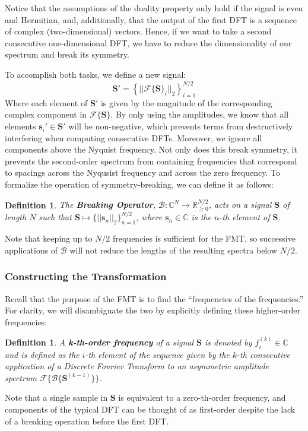 \documentclass[11pt,twoside]{report}
\newtheorem{definition}[thm]{Definition}
\numberwithin{thm}{section}
\numberwithin{equation}{section}
\begin{document}
Notice that the assumptions of the duality property only hold if the signal is even and Hermitian, and, additionally, that the output of the first DFT is a sequence of complex (two-dimensional) vectors. Hence, if we want to take a second consecutive one-dimensional DFT, we have to reduce the dimensionality of our spectrum and break its symmetry. 

To accomplish both tasks, we define a new signal:
\begin{equation}
 \mathbf{S}' = \displaystyle\left\{||\mathcal{F}\{\mathbf{S}\}_i||_2\right\}_{i=1}^{N/2}   
\end{equation}
Where each element of $\mathbf{S}'$ is given by the magnitude of the corresponding complex component in $\mathcal{F}\{\mathbf{S}\}$. By only using the amplitudes, we know that all elements $\mathbf{s}_i' \in \mathbf{S}'$ will be non-negative, which prevents terms from destructively interfering when computing consecutive DFTs. Moreover, we ignore all components above the Nyquist frequency. Not only does this break symmetry, it prevents the second-order spectrum from containing frequencies that correspond to spacings across the Nyqusist frequency and across the zero frequency. To formalize the operation of symmetry-breaking, we can define it as follows:
\begin{definition}
    The \textbf{Breaking Operator}, $\mathcal{B}: \mathbb{C}^N \to \mathbb{R}_{\geq0}^{N/2}$, acts on a signal $\mathbf{S}$ of length $N$ such that $\mathbf{S} \mapsto \{||\mathbf{s}_n||_2\}_{n=1}^{N/2}$, where $\mathbf{s}_n\in \mathbb{C}$ is the $n$-th element of $\mathbf{S}$.
\end{definition}
Note that keeping up to $N/2$ frequencies is sufficient for the FMT, so successive applications of $\mathcal{B}$ will not reduce the lengths of the resulting spectra below $N/2$.

\subsubsection{Constructing the Transformation}
Recall that the purpose of the FMT is to find the ``frequencies of the frequencies.'' For clarity, we will disambiguate the two by explicitly defining these higher-order frequencies:
\begin{definition}
    A \textbf{k-th-order frequency} of a signal $\mathbf{S}$ is denoted by $f_i^{(k)} \in \mathbb{C}$ and is defined as the $i$-th element of the sequence given by the $k$-th consecutive application of a Discrete Fourier Transform to an asymmetric amplitude spectrum $\mathcal{F}\{\mathcal{B}\{\mathbf{S}^{(k - 1)}\}\}$.
\end{definition}
Note that a single sample in $\mathbf{S}$ is equivalent to a zero-th-order frequency, and components of the typical DFT can be thought of as first-order despite the lack of a breaking operation before the first DFT.
\end{document}
